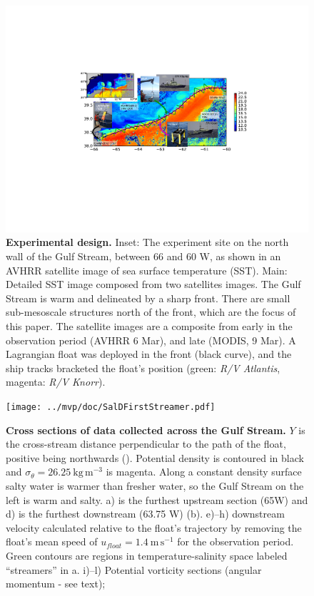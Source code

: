 \documentclass{natureJMK}
\begin{document}
\begin{figure}[htbp]
  \centering
    \includegraphics[width=\textwidth]{./SatOverviewSecDTry2.pdf}
   \caption{{\bf Experimental design.}  Inset: The experiment site on the north wall of the Gulf Stream, between 66 and 60 W, as shown in an AVHRR satellite image of sea surface temperature (SST).  Main:  Detailed SST image composed from two satellites images.    The Gulf Stream is warm and delineated by a sharp front.  There are small sub-mesoscale structures north of the front, which are the focus of this paper.  The satellite images are a composite from early in the observation period (AVHRR 6 Mar), and late (MODIS, 9 Mar).  A Lagrangian float was deployed in the front (black curve), and the ship tracks bracketed the float's position (green: \emph{R/V Atlantis}, magenta: \emph{R/V Knorr}).   }\label{fig:SatOverviewSectD}
\end{figure}

\begin{figure}[htbp]
  \centering
    \texttt{[image: ../mvp/doc/SalDFirstStreamer.pdf]}
    \caption{{\bf Cross sections of data collected across the Gulf Stream.}   $Y$ is the cross-stream distance perpendicular to the path of the float, positive being northwards (). Potential density is contoured in black and $\sigma_{\theta}=26.25\ \mathrm{kg\,m^{-3}}$ is magenta.  Along a constant density surface salty water is warmer than fresher water, so the Gulf Stream on the left is warm and salty.  a) is the furthest upstream section (65W) and d) is the furthest downstream (63.75 W) (b).  e)--h) downstream velocity calculated relative to the float's trajectory by removing the float's mean speed of $u_{float}=1.4\ \mathrm{m\,s^{-1}}$ for the observation period.   Green contours are regions in temperature-salinity space labeled ``streamers'' in a.  i)--l) Potential vorticity sections (angular momentum - see text); 
 } \label{fig:SalDFirstStreamer}
\end{figure}
\end{document}
